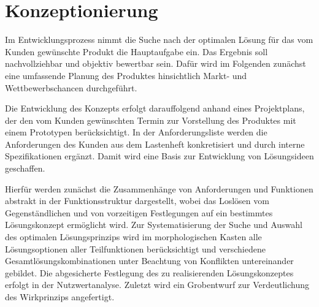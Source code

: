 
\chapter{Konzeptionierung}

Im Entwicklungsprozess nimmt die Suche nach der optimalen Lösung für das vom Kunden gewünschte Produkt die Hauptaufgabe ein. Das Ergebnis soll nachvollziehbar und objektiv bewertbar sein. Dafür wird im Folgenden zunächst eine umfassende Planung des Produktes hinsichtlich Markt- und Wettbewerbschancen durchgeführt.

Die Entwicklung des Konzepts erfolgt darauffolgend anhand eines Projektplans, der den vom Kunden gewünschten Termin zur Vorstellung des Produktes mit einem Prototypen berücksichtigt. In der Anforderungsliste werden die Anforderungen des Kunden aus dem Lastenheft konkretisiert und durch interne Spezifikationen ergänzt. Damit wird eine Basis zur Entwicklung von Lösungsideen geschaffen.

Hierfür werden zunächst die Zusammenhänge von Anforderungen und Funktionen abstrakt in der Funktionsstruktur dargestellt, wobei das Loslösen vom Gegenständlichen und von vorzeitigen Festlegungen auf ein bestimmtes Lösungskonzept ermöglicht wird. Zur Systematisierung der Suche und Auswahl des optimalen Lösungsprinzips wird im morphologischen Kasten alle Lösungsoptionen aller Teilfunktionen berücksichtigt und verschiedene Gesamtlösungskombinationen unter Beachtung von Konflikten untereinander gebildet. Die abgesicherte Festlegung des zu realisierenden Lösungskonzeptes erfolgt in der Nutzwertanalyse. Zuletzt wird ein Grobentwurf zur Verdeutlichung des Wirkprinzips angefertigt.

